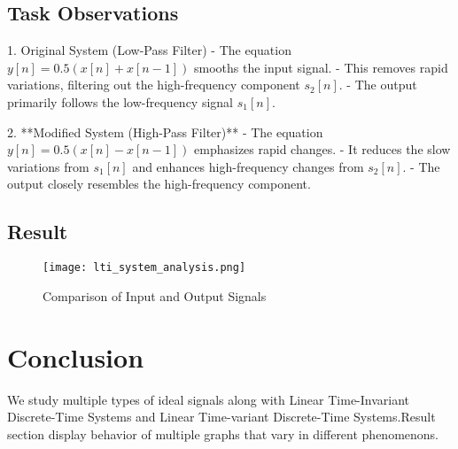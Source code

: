 \documentclass[a4paper,12pt]{article}
\begin{document}
\subsection{Task Observations}
1. Original System (Low-Pass Filter)
   - The equation \( y[n] = 0.5(x[n] + x[n-1]) \) smooths the input signal.
   - This removes rapid variations, filtering out the high-frequency component \( s_2[n] \).
   - The output primarily follows the low-frequency signal \( s_1[n] \).

2. **Modified System (High-Pass Filter)**
   - The equation \( y[n] = 0.5(x[n] - x[n-1]) \) emphasizes rapid changes.
   - It reduces the slow variations from \( s_1[n] \) and enhances high-frequency changes from \( s_2[n] \).
   - The output closely resembles the high-frequency component.
\subsection{Result}
\begin{figure}[H]
    \centering
    \texttt{[image: lti\_system\_analysis.png]}
    \caption{Comparison of Input and Output Signals}
    \label{fig:lti_analysis}
\end{figure}


   
\section{Conclusion}
We study multiple types of ideal signals along with Linear Time-Invariant Discrete-Time Systems and Linear Time-variant Discrete-Time Systems.Result section display behavior of multiple graphs that vary in different phenomenons.
\end{document}
